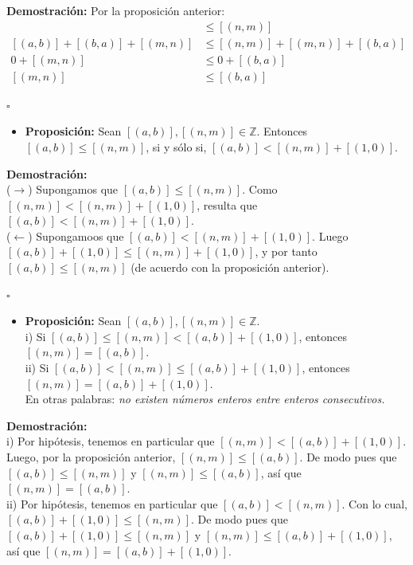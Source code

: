 \documentclass[10 pt]{article}
\begin{document}
\Large{\textbf{Demostración:} Por la proposición anterior:}
\begin{align*}
    [(a,b)]& \leq [(n,m)] \\
    [(a,b)]+[(b,a)]+[(m,n)]& \leq [(n,m)]+[(m,n)]+[(b,a)] \\
    0+[(m,n)]& \leq 0+[(b,a)] \\
    [(m,n)]& \leq [(b,a)]
\end{align*}
\begin{flushright}
    $\square$
\end{flushright}

\begin{itemize}
    \item \Large{\textbf{Proposición:} Sean $[(a,b)],[(n,m)] \in \mathbb Z$. Entonces $[(a,b)] \leq [(n,m)]$, si y sólo si, $[(a,b)]<[(n,m)]+[(1,0)]$.} \\
\end{itemize}

\Large{\textbf{Demostración:} \\

($\rightarrow$) Supongamos que $[(a,b)] \leq [(n,m)]$. Como $[(n,m)]<[(n,m)]+[(1,0)]$, resulta que $[(a,b)]<[(n,m)]+[(1,0)]$. \\

($\leftarrow$) Supongamoos que $[(a,b)]<[(n,m)]+[(1,0)]$. Luego $[(a,b)]+[(1,0)] \leq [(n,m)]+[(1,0)]$, y por tanto $[(a,b)] \leq [(n,m)]$ (de acuerdo con la proposición anterior).}\\

\begin{flushright}
    $\square$
\end{flushright}

\begin{itemize}
    \item \Large{\textbf{Proposición:} Sean $[(a,b)],[(n,m)] \in \mathbb Z$. \\

    i) Si $[(a,b)] \leq [(n,m)]<[(a,b)]+[(1,0)]$, entonces $[(n,m)]=[(a,b)]$. \\

    ii) Si $[(a,b)]<[(n,m)] \leq [(a,b)]+[(1,0)]$, entonces $[(n,m)]=[(a,b)]+[(1,0)]$. \\

    En otras palabras: \textit{no existen números enteros entre enteros consecutivos.}} \\
\end{itemize}

\Large{\textbf{Demostración:} \\

i) Por hipótesis, tenemos en particular que $[(n,m)]<[(a,b)]+[(1,0)]$. Luego, por la proposición anterior, $[(n,m)] \leq [(a,b)]$. De modo pues que $[(a,b)] \leq [(n,m)]$ y $[(n,m)] \leq [(a,b)]$, así que $[(n,m)]=[(a,b)]$. \\

ii) Por hipótesis, tenemos en particular que $[(a,b)]<[(n,m)]$. Con lo cual, $[(a,b)]+[(1,0)] \leq [(n,m)]$. De modo pues que $[(a,b)]+[(1,0)] \leq [(n,m)]$ y $[(n,m)] \leq [(a,b)]+[(1,0)]$, así que $[(n,m)]=[(a,b)]+[(1,0)]$.} \\
\end{document}
